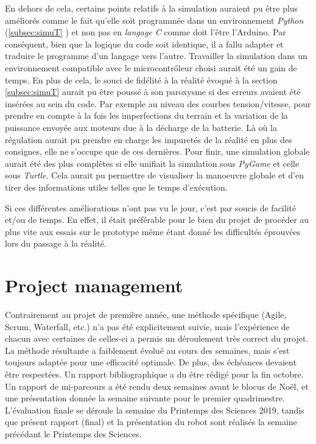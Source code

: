 \documentclass[a4paper,11pt]{article}
\begin{document}
En dehors de cela, certains points relatifs à la simulation auraient pu être plus améliorés comme le fait qu'elle soit programmée dans un environnement \textit{Python} (\ref{subsec:simuT} \pageref{subsec:simuT}) et non pas en \textit{langage C} comme doit l'être l'Arduino. Par conséquent, bien que la logique du code soit identique, il a fallu adapter et traduire le programme d'un langage vers l'autre. Travailler la simulation dans un environnement compatible avec le microcontrôleur choisi aurait été un gain de temps. En plus de cela, le souci de fidélité à la réalité évoqué à la section \ref{subsec:simuT} aurait pu être poussé à son paroxysme si des erreurs avaient été insérées au sein du code. Par exemple au niveau des courbes tension/vitesse, pour prendre en compte à la fois les imperfections du terrain et la variation de la puissance envoyée aux moteurs due à la décharge de la batterie. Là où la régulation aurait pu prendre en charge les impuretés de la réalité en plus des consignes, elle ne s'occupe que de ces dernières. Pour finir, une simulation globale aurait été des plus complètes si elle unifiait la simulation sous \textit{PyGame} et celle sous \textit{Turtle}. Cela aurait pu permettre de visualiser la manoeuvre globale et d'en tirer des informations utiles telles que le temps d'exécution.

Si ces différentes améliorations n'ont pas vu le jour, c'est par soucis de facilité et/ou de temps. En effet, il était préférable pour le bien du projet de procéder au plus vite aux essais sur le prototype même étant donné les difficultés éprouvées lors du passage à la réalité.

\clearpage

\section{Project management}

Contrairement au projet de première année, une méthode spécifique (Agile, Scrum, Waterfall, etc.) n'a pas été explicitement suivie, mais l'expérience de chacun avec certaines de celles-ci a permis un déroulement très correct du projet. La méthode résultante a faiblement évolué au cours des semaines, mais s'est toujours adaptée pour une efficacité optimale. De plus, des échéances devaient être respectées. Un rapport bibliographique a du être rédigé pour la fin octobre. Un rapport de mi-parcours a été rendu deux semaines avant le blocus de Noël, et une présentation donnée la semaine suivante pour le premier quadrimestre. L'évaluation finale se déroule la semaine du Printemps des Sciences 2019, tandis que présent rapport (final) et la présentation du robot sont réalisés la semaine précédant le Printemps des Sciences.
\end{document}
